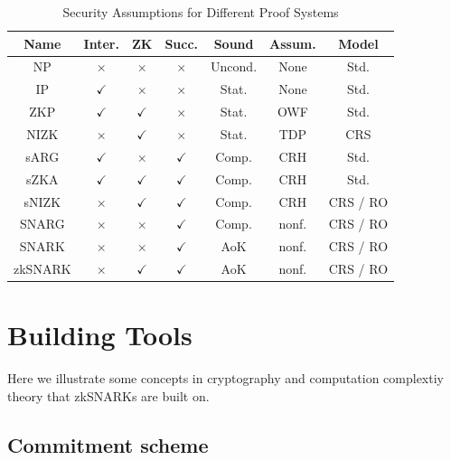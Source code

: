 \documentclass[acmtog]{acmart}
\begin{document}
\begin{table}[tb]
	\caption{Security Assumptions for Different Proof Systems}
	\label{tab:security.assumption}
	\centering

	\begin{tabular}{ccccccc}
	\hline

	\hline
	\textbf{Name} & \textbf{Inter.} & \textbf{ZK} & \textbf{Succ.} & \textbf{Sound} & \textbf{Assum.} & \textbf{Model} \\
	\hline
		NP          & $\times$     & $\times$     & $\times$     & Uncond. & None       & Std. \\
		IP          & $\checkmark$ & $\times$     & $\times$     & Stat.   & None       & Std. \\
		ZKP         & $\checkmark$ & $\checkmark$ & $\times$     & Stat.   & OWF        & Std. \\
		NIZK        & $\times$     & $\checkmark$ & $\times$     & Stat.   & TDP        & CRS \\
		sARG        & $\checkmark$ & $\times$     & $\checkmark$ & Comp.   & CRH        & Std. \\
		sZKA        & $\checkmark$ & $\checkmark$ & $\checkmark$ & Comp.   & CRH        & Std.\\
		sNIZK       & $\times$     & $\checkmark$ & $\checkmark$ & Comp.   & CRH        & CRS / RO \\
		SNARG       & $\times$     & $\times$     & $\checkmark$ & Comp.   & nonf.      & CRS / RO  \\
		SNARK       & $\times$     & $\times$     & $\checkmark$ & AoK     & nonf.      & CRS / RO \\
		zkSNARK     & $\times$     & $\checkmark$ & $\checkmark$ & AoK     & nonf.      & CRS / RO  \\
	\hline

	\hline
	\end{tabular}
\end{table}


\section{Building Tools}
\label{sec:build.tool}

Here we illustrate some concepts in cryptography and computation complextiy theory that zkSNARKs are built on.

\subsection{Commitment scheme}
\label{sec:commitment}
\end{document}
